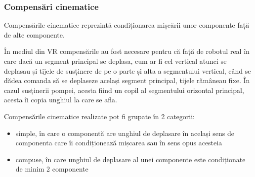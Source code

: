 \subsubsection{Compensări cinematice}

Compensările cinematice reprezintă condiționarea mișcării unor componente față de alte componente. 

În mediul din VR compensările au fost necesare pentru că față de robotul real în care dacă un segment principal se deplasa, cum ar fi cel vertical atunci se deplasau și tijele de susținere de pe o parte și alta a segmentului vertical, când se dădea comanda să se deplaseze același segment principal, tijele rămâneau fixe. În cazul susținerii pompei, acesta fiind un copil al segmentului orizontal principal, acesta îi copia unghiul la care se afla.


Compensările cinematice realizate pot fi grupate în 2 categorii:
\begin{itemize}
	\item simple, în care o componentă are unghiul de deplasare în același sens de componenta care îi condiționează mișcarea sau în sens opus acesteia
	\item compuse, în care unghiul de deplasare al unei componente este condiționate de minim 2 componente
\end{itemize}

